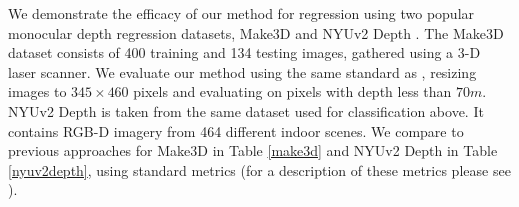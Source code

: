We demonstrate the efficacy of our method for regression using two popular monocular depth regression datasets, Make3D \citep{saxena2009make3d} and NYUv2 Depth \citep{silberman2012indoor}. The Make3D dataset consists of 400 training and 134 testing images, gathered using a 3-D laser scanner. We evaluate our method using the same standard as \citep{laina2016deeper}, resizing images to $345\times460$ pixels and evaluating on pixels with depth less than $70m$. NYUv2 Depth is taken from the same dataset used for classification above. It contains RGB-D imagery from 464 different indoor scenes. We compare to previous approaches for Make3D in Table \ref{make3d} and NYUv2 Depth in Table \ref{nyuv2depth}, using standard metrics (for a description of these metrics please see \citep{eigen2014depth}).





